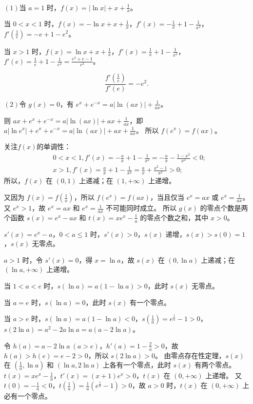 \begin{jie}
\ 

$(1)$当 $a=1$ 时，$f(x) = |\ln x| + x + \frac{1}{x}$。

当 $0 < x < 1$ 时，$f(x) = -\ln x + x + \frac{1}{x}$，$f'(x) = -\frac{1}{x} + 1 - \frac{1}{x^2}$，$f'\left(\frac{1}{e}\right) = -e + 1 - e^2$。

当 $x > 1$ 时，$f(x) = \ln x + x + \frac{1}{x}$，$f'(x) = \frac{1}{x} + 1 - \frac{1}{x^2}$，$f'(e) = \frac{1}{e} + 1 - \frac{1}{e^2} = \frac{e^2 + e - 1}{e^2}$。

\[
\frac{f'\left(\frac{1}{e}\right)}{f'(e)} = -e^2.
\]


$(2) $令 $g(x) = 0$，有 $e^x + e^{-x} = a|\ln(ax)| + \frac{1}{ax}$。
    
则 $ax + e^x + e^{-x} = a|\ln(ax)| + ax + \frac{1}{ax}$，即 $a|\ln e^x| + e^x + e^{-x} = a|\ln(ax)| + ax + \frac{1}{ax}$。
所以 $f(e^x) = f(ax)$。

关注\(f(x)\)的单调性：
    \[
    \begin{aligned}
        &0 < x < 1 , f'(x) = -\frac{a}{x} + 1 - \frac{1}{x^2} = -\frac{a}{x} - \frac{1-x^2}{x^2} < 0; \\
        &x > 1 ,f'(x) = \frac{a}{x} + 1 - \frac{1}{x^2} = \frac{a}{x} + \frac{x^2-1}{x^2} > 0;
    \end{aligned}
    \]
所以，$f(x)$ 在 $(0,1)$ 上递减；在 $(1,+\infty)$ 上递增。
    
    又因为 $f(x) = f\left(\frac{1}{x}\right)$，所以 $f(e^x) = f(ax)$，当且仅当 $e^x = ax$ 或 $e^x = \frac{1}{ax}$。
    又 $e^x > 1$，故 $e^x = ax$ 和 $e^x = \frac{1}{ax}$ 不可能同时成立。
    所以 $g(x)$ 的零点个数是两个函数 $s(x) = e^x - ax$ 和 $t(x) = xe^x - \frac{1}{a}$ 的零点个数之和，其中 $x > 0$。
    
    $s'(x) = e^x - a$，$0 < a \leq 1$ 时，$s'(x) > 0$，$s(x)$ 递增，$s(x) > s(0) = 1$，$s(x)$ 无零点。
    
    $a > 1$ 时，令 $s'(x) = 0$，得 $x = \ln a$，故 $s(x)$ 在 $(0, \ln a)$ 上递减；在 $(\ln a, +\infty)$ 上递增。
    
    当 $1 < a < e$ 时，$s(\ln a) = a(1 - \ln a) > 0$，此时 $s(x)$ 无零点。
    
    当 $a = e$ 时，$s(\ln a) = 0$，此时 $s(x)$ 有一个零点。
    
    当 $a > e$ 时，$s(\ln a) = a(1 - \ln a) < 0$，$s\left(\frac{1}{a}\right) = e^{\frac{1}{a}} - 1 > 0$，$s(2\ln a) = a^2 - 2a\ln a = a(a - 2\ln a)$。
    
    令 $h(a) = a - 2\ln a \ (a > e)$，$h'(a) = 1 - \frac{2}{a} > 0$，故 $h(a) > h(e) = e - 2 > 0$，所以 $s(2\ln a) > 0$。
    由零点存在性定理，$s(x)$ 在 $\left(\frac{1}{a}, \ln a\right)$ 和 $(\ln a, 2\ln a)$ 上各有一个零点，此时 $s(x)$ 有两个零点。
     $t(x) = xe^x - \frac{1}{a}$，$t'(x) = (x + 1)e^x > 0$，$t(x)$ 在 $(0, +\infty)$ 上递增。
    又 $t(0) = -\frac{1}{a} < 0$，$t\left(\frac{1}{a}\right) = \frac{1}{a}\left(e^{\frac{1}{a}} - 1\right) > 0$，故 $a > 0$ 时，$t(x)$ 在 $(0, +\infty)$ 上必有一个零点。
    

\end{jie}
